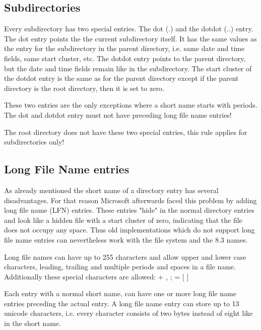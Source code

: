 \subsection{Subdirectories}

Every subdirectory has two special entries. The dot (.) and the dotdot (..) entry. The dot entry points the the current subdirectory itself. It has the same values as the entry for the subdirectory in the parent directory, i.e. same date and time fields, same start cluster, etc. The dotdot entry points to the parent directory, but the date and time fields remain like in the subdirectory. The start cluster of the dotdot entry is the same as for the parent directory except if the parent directory is the root directory, then it is set to zero.

These two entries are the only exceptions where a short name starts with periods. The dot and dotdot entry must not have preceding long file name entries!

The root directory does not have these two special entries, this rule applies for subdirectories only!

\subsection{Long File Name entries}

As already mentioned the short name of a directory entry has several disadvantages. For that reason Microsoft afterwards faced this problem by adding long file name (LFN) entries. These entries "hide" in the normal directory entries and look like a hidden file with a start cluster of zero, indicating that the file does not occupy any space. Thus old implementations which do not support long file name entries can nevertheless work with the file system and the 8.3 names.

Long file names can have up to 255 characters and allow upper and lower case characters, leading, trailing and multiple periods and spaces in a file name\cite{usb_ms_jan}. Additionally these special characters are allowed\cite{fatgen103}: + , ; = [ ] 

Each entry with a normal short name, can have one or more long file name entries preceding the actual entry. A long file name entry can store up to 13 unicode characters, i.e. every character consists of two bytes instead of eight like in the short name.

